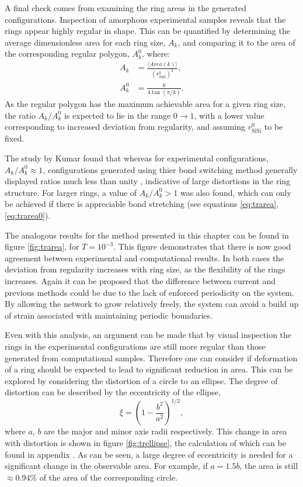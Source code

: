 A final check comes from examining the ring areas in the generated configurations.
Inspection of amorphous experimental samples reveals that the rings appear highly regular in shape. 
This can be quantified by determining the average dimensionless area for each ring size, $A_k$, and comparing it to the area of the corresponding regular polygon, $A_k^0$, where:
\begin{align}
	A_k &= \frac{\langle Area\left(k\right) \rangle}{\left(r_{\text{SiSi}}^{0}\right)^2}, \label{eq:trarea} \\[0.5em]
	A_k^0 &= \frac{k}{4\tan\left(\pi / k \right)} \label{eq:trarea0}.
\end{align}
As the regular polygon has the maximum achievable area for a given ring size, the ratio $A_k / A_k^0$ is expected to lie in the range $0\rightarrow 1$, with a lower value corresponding to increased deviation from regularity, and assuming $r_{\text{SiSi}}^{0}$ to be fixed.

The study by Kumar \etal{} found that whereas for experimental configurations, $A_k / A_k^0 \approx 1$, configurations generated using thier bond switching method generally displayed ratios much less than unity \cite{Kumar2012}, indicative of large distortions in the ring structure. 
For larger rings, a value of $A_k / A_k^0 > 1$ was also found, which can only be achieved if there is appreciable bond stretching (see equations \eqref{eq:trarea}, \eqref{eq:trarea0}). 

The analogous results for the method presented in this chapter can be found in figure \ref{fig:trarea}, for $T=10^{-3}$. 
This figure demonstrates that there is now good agreement between experimental and computational results. 
In both cases the deviation from regularity increases with ring size, as the flexibility of the rings increases. 
Again it can be proposed that the difference between current and previous methods could be due to the lack of enforced periodicity on the system. 
By allowing the network to grow relatively freely, the system can avoid a build up of strain associated with maintaining periodic boundaries.

Even with this analysis, an argument can be made that by visual inspection the rings in the experimental configurations are still more regular than those generated from computational samples. 
Therefore one can consider if deformation of a ring should be expected to lead to significant reduction in area. 
This can be explored by considering the distortion of a circle to an ellipse. 
The degree of distortion can be described by the eccentricity of the ellipse,
\begin{equation}
	\xi = \left(1-\frac{b^2}{a^2}\right)^{1/2},
\end{equation}
where $a$, $b$ are the major and minor axis radii respectively. 
This change in area with distortion is shown in figure \ref{fig:trellipse}, the calculation of which can be found in appendix . 
As can be seen, a large degree of eccentricity is needed for a significant change in the observable area. 
For example, if $a=1.5 b$, the area is still $\approx0.94\%$ of the area of the corresponding circle. 

